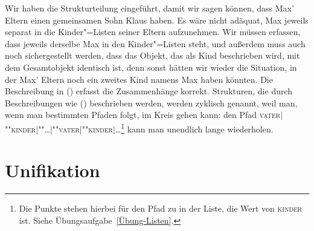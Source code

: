 Wir haben die Strukturteilung eingeführt, damit wir sagen können, dass
Max' Eltern einen gemeinsamen Sohn Klaus haben. Es wäre nicht adäquat,
Max jeweils separat in die Kinder"=Listen seiner Eltern aufzunehmen.
Wir müssen erfassen, dass jeweils derselbe Max in den Kinder"=Listen
steht, und außerdem muss auch noch sichergestellt werden, dass das
Objekt, das als Kind beschrieben wird, mit dem Gesamtobjekt identisch
ist, denn sonst hätten wir wieder die Situation, in der Max' Eltern
noch ein zweites Kind namens Max haben könnten.
Die Beschreibung in () erfasst die Zusammenhänge korrekt.
\largerpage[1.2]
\ea
\label{bsp-avm-zyklen}
 
\z
Strukturen, die durch Beschreibungen wie () beschrieben werden, werden zyklisch genannt, weil man, wenn man bestimmten
Pfaden folgt, im Kreis gehen kann: \ZB den Pfad \textsc{vater$|$""kinder$|$""\ldots$|$""vater$|$""kinder$|$\ldots}\footnote{
  Die Punkte stehen hierbei für den Pfad zu  in der Liste, die
  Wert von \textsc{kinder} ist. Siehe Übungsaufgabe~\ref{Übung-Listen}.%
}
kann man unendlich lange wiederholen.

\section{Unifikation}
\label{sec-unifikation}

